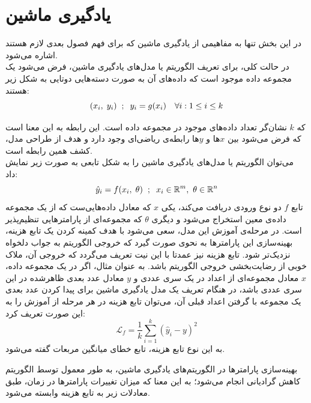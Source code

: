 
\section{یادگیری ماشین}
در این بخش تنها به مفاهیمی از یادگیری ماشین که برای فهم فصول بعدی لازم هستند اشاره می‌شود. \\
در حالت کلی، برای تعریف الگوریتم یا مدل‌های یادگیری ماشین، فرض می‌شود یک مجموعه داده موجود است که داده‌های آن به صورت دسته‌هایی دوتایی به شکل زیر هستند:
\begin{equation}
    (x_i, \hspace{1mm} y_i) \hspace{2mm} ; \hspace{2mm} y_i = g(x_i) \quad  \forall i : 1 \leq i \leq k
\end{equation}

که
$k$
نشان‌گر تعداد داده‌های موجود در مجموعه داده است.
این رابطه به این معنا است که فرض می‌شود بین 
$x$ها
و
$y$ها
رابطه‌ی ریاضی‌ای وجود دارد و هدف از طراحی مدل، کشف همین رابطه است. \\
می‌توان الگوریتم یا مدل‌های یادگیری ماشین را به شکل تابعی به صورت زیر نمایش داد:
\begin{equation}
    \Hat{y}_i = f(x_i, \hspace{1mm} \theta) \hspace{2mm} ; \hspace{2mm} x_i \in \mathbb{R}^m, \hspace{1.2mm} \theta \in \mathbb{R}^n
\end{equation}
تابع
$f$
دو نوع ورودی دریافت می‌کند، یکی
$x$
که معادل داده‌هایی‌ست که از یک مجموعه داده‌ی معین استخراج می‌شود و دیگری
$\theta$
که مجموعه‌ای از پارامترهایی تنظیم‌پذیر است. در مرحله‌ی آموزش این مدل، سعی می‌شود با هدف کمینه کردن یک تابع هزینه، بهینه‌سازی این پارامترها به نحوی صورت گیرد که خروجی الگوریتم به جواب دلخواه نزدیک‌تر شود.
تابع هزینه نیز عمدتا با این نیت تعریف می‌گردد که خروجی آن، ملاک خوبی از رضایت‌بخشی خروجی الگوریتم باشد. به عنوان مثال، اگر در یک مجموعه داده،
$x$
معادل مجموعه‌ای از اعداد در یک سری عددی
و
$y$
معادل عدد بعدی ظاهرشده در این سری عددی باشد، در هنگام تعریف یک مدل یادگیری ماشین برای پیدا کردن عدد بعدی یک مجموعه با گرفتن اعداد قبلی آن، می‌توان تابع هزینه در هر مرحله از آموزش را به این صورت تعریف کرد:
\begin{equation} \label{eqn:mse}
    \mathcal{L}_f = \frac{1}{k} \sum_{i=1}^{k} (\hat{y}_i - y)^2
\end{equation}
\hsm
به این نوع تابع هزینه، تابع خطای میانگین مربعات گفته می‌شود.

بهینه‌سازی پارامترها در الگوریتم‌های یادگیری ماشین، به طور معمول توسط الگوریتم کاهش گرادیانی
انجام می‌شود؛ به این معنا که میزان تغییرات پارامترها در زمان، طبق معادلات زیر به تابع هزینه وابسته می‌شود.

